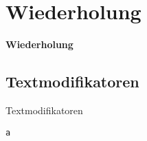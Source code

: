 \documentclass["WS\space 16-17\space -\space LaTeX-Kurs\space -\space Praesentation\space -\space 4.tex"]{subfiles}
\begin{document}
\section{Wiederholung}
\begin{frame}[c]
	\begin{center}
		\LARGE \textbf{Wiederholung}
	\end{center}
\end{frame}
\subsection{Textmodifikatoren}
\begin{frame}[c]
	\begin{center}
		\large Textmodifikatoren
	\end{center}
\end{frame}
\begin{frame}[fragile]
	\Ausgabe
	\begin{outputbox}
		
	\end{outputbox}

	\pause\Code
	\begin{lstlisting}
a
	\end{lstlisting}
\end{frame}
\end{document}
